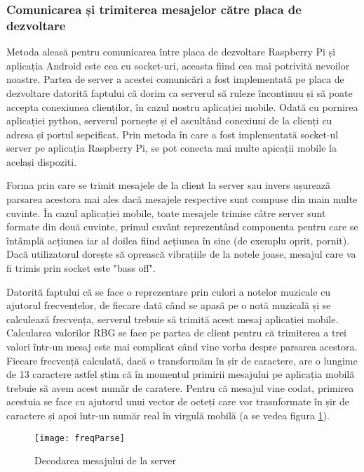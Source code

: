 \documentclass[../IoMusT.tex]{subfiles}
\begin{document}
\subsubsection{Comunicarea și trimiterea mesajelor către placa de dezvoltare}
Metoda aleasă pentru comunicarea între placa de dezvoltare Raspberry Pi și aplicația Android este cea cu socket-uri, aceasta fiind cea mai potrivită nevoilor noastre. Partea de server a acestei comunicări a fost implementată pe placa de dezvoltare datorită faptului că dorim ca serverul să ruleze încontinuu și să poate accepta conexiunea clienților, în cazul nostru aplicației mobile. Odată cu pornirea aplicației python, serverul pornește și el ascultând conexiuni de la clienți cu adresa și portul sepcificat. Prin metoda în care a fost implementată socket-ul server pe aplicația Raspberry Pi, se pot conecta mai multe apicații mobile la același dispoziti.
\\
\par Forma prin care se trimit mesajele de la client la server sau invers ușurează parsarea acestora mai ales dacă mesajele respective sunt compuse din main multe cuvinte. În cazul aplicației mobile, toate mesajele trimise câtre server sunt formate din două cuvinte, primul cuvânt reprezentând componenta pentru care se întâmplă acțiunea iar al doilea fiind acțiunea în sine (de exemplu oprit, pornit). Dacă utilizatorul dorește să oprească vibrațiile de la notele joase, mesajul care va fi trimis prin socket este "bass off". 
\\
\par Datorită faptului că se face o reprezentare prin culori a notelor muzicale cu ajutorul frecvențelor, de fiecare dată când se apasă pe o notă muzicală și se calculează frecvența, serverul trebuie să trimită acest mesaj aplicației mobile. Calcularea valorilor RBG se face pe partea de client pentru că trimiterea a trei valori într-un mesaj este mai complicat când vine vorba despre parsarea acestora. Fiecare frecvență calculată, dacă o transformăm în șir de caractere, are o lungime de 13 caractere astfel știm că în momentul primirii mesajului pe aplicația mobilă trebuie să avem acest număr de caratere. Pentru că mesajul vine codat, primirea acestuia se face cu ajutorul unui vector de octeți care vor trasnformate în șir de caractere și apoi într-un număr real în virgulă mobilă (a se vedea figura \ref{fig:freqParse}).
\begin{figure}[h]
\centering
\texttt{[image: freqParse]}
\caption{Decodarea mesajului de la server}
\label{fig:freqParse}
\end{figure} 
\end{document}
